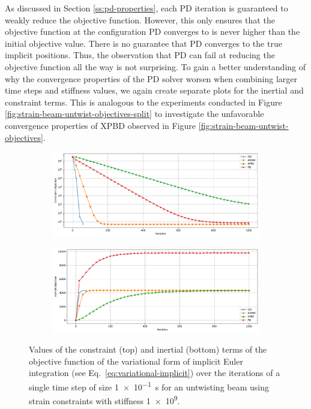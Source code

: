 As discussed in Section \ref{ss:pd-properties}, each PD iteration is guaranteed to weakly reduce the objective function. However, this only ensures that the objective function 
at the configuration PD converges to is never higher than the initial objective value. There is no guarantee that 
PD converges to the true implicit positions. Thus, the observation that PD can fail at reducing the objective function all the way is not surprising. To gain a better 
understanding of why the convergence properties of the PD solver worsen when combining larger time steps and stiffness values, we again create separate plots for the 
inertial and constraint terms. This is analogous to the experiments conducted in Figure \ref{fig:strain-beam-untwist-objectives-split} to investigate 
the unfavorable convergence properties of XPBD observed in Figure \ref{fig:strain-beam-untwist-objectives}. 

\begin{figure}[t]
    \centering
    \begin{subfigure}{\textwidth}
        \includegraphics[width=\linewidth]{figures/strain_beam_untwist_constraintObjectives_large_ts.pdf}
    \end{subfigure}
    \begin{subfigure}{\textwidth}
        \includegraphics[width=\linewidth]{figures/strain_beam_untwist_inertialObjectives_large_ts.pdf}
    \end{subfigure}
    \caption{Values of the constraint (top) and inertial (bottom) terms of the objective function of the variational form of implicit Euler integration 
        (see Eq.\ \ref{eq:variational-implicit}) over the iterations of a single time step of size \SI{1e-1}{\second} for an untwisting beam using strain constraints with 
    stiffness \num{1e9}.}
    \label{fig:strain-beam-untwist-objectives-split-large-ts}
\end{figure}

